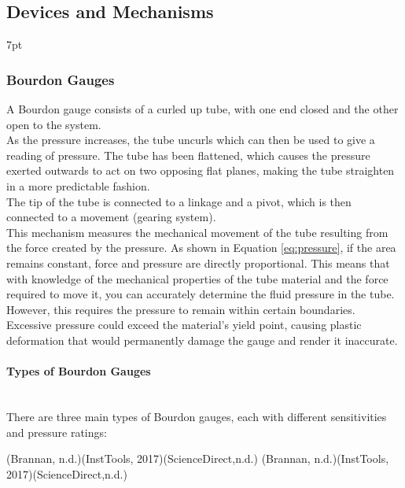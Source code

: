 \documentclass{article}
\newcommand{\formalsource}{} %
\newenvironment{formal}[3][]{%
	\renewcommand{\formalsource}{#1}%
	\def\FrameCommand{%
		\hspace{1pt}%
		{\color{#2}\vrule width 2pt}%
		{\color{#3}\vrule width 4pt}%
		\colorbox{#3}%
	}%
	\MakeFramed{\advance\hsize-\width\FrameRestore}%
	\noindent\hspace{-4.55pt}%
	\begin{adjustwidth}{}{7pt}%
		\vspace{2pt}%
	}%
	{%
		\vspace{4pt}%
		\ifx\formalsource\empty %
		\else
		\hfill{\footnotesize{\formalsource}}%
		\fi
	\end{adjustwidth}\endMakeFramed%
}
\begin{document}
\subsection{Devices and Mechanisms}
\begin{formal}[(Brannan, n.d.)(InstTools, 2017)(ScienceDirect,n.d.)]{black!60!white}{white!93!gray}
\vspace{-1em}
\subsubsection{Bourdon Gauges}	
A Bourdon gauge consists of a curled up tube, with one end closed and the other open to the system.\\[8pt] 
As the pressure increases, the tube uncurls which can then be used to give a reading of pressure. The tube has been flattened, which causes the pressure exerted outwards to act on two opposing flat planes, making the tube straighten in a more predictable fashion.\\[8pt]
The tip of the tube is connected to a linkage and a pivot, which is then connected to a movement (gearing system).\\[8pt]
This mechanism measures the mechanical movement of the tube resulting from the force created by the pressure. As shown in Equation \ref{eq:pressure}, if the area remains constant, force and pressure are directly proportional. This means that with knowledge of the mechanical properties of the tube material and the force required to move it, you can accurately determine the fluid pressure in the tube.\\[8pt] 
However, this requires the pressure to remain within certain boundaries. Excessive pressure could exceed the material's yield point, causing plastic deformation that would permanently damage the gauge and render it inaccurate.\\\vspace{-2em}
\paragraph{Types of Bourdon Gauges}\mbox{}\\[8pt]
There are three main types of Bourdon gauges, each with different sensitivities and pressure ratings:


\end{formal}
\end{document}
